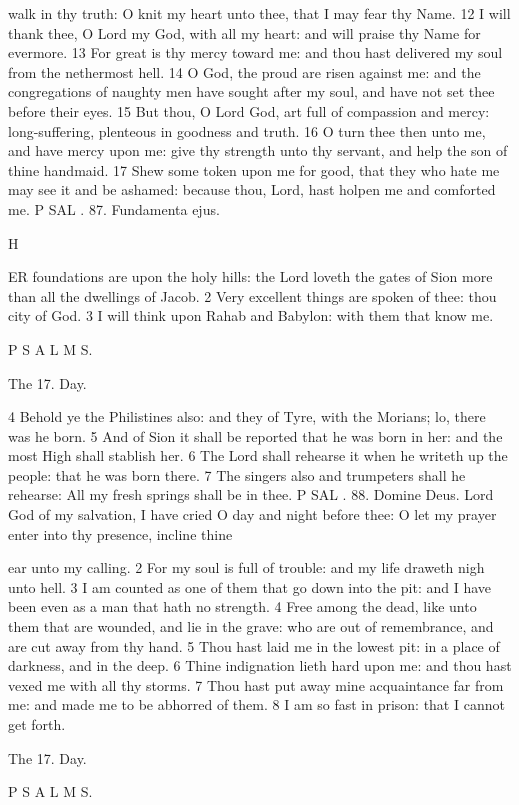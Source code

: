 walk in thy truth: O knit my heart unto thee, that I may fear thy Name. 12 I will thank thee, O Lord my God, with all my heart: and will praise thy Name for evermore. 13 For great is thy mercy toward me: and thou hast delivered my soul from the nethermost hell. 14 O God, the proud are risen against me: and the congregations of naughty men have sought after my soul, and have not set thee before their eyes. 15 But thou, O Lord God, art full of compassion and mercy: long-suffering, plenteous in goodness and truth. 16 O turn thee then unto me, and have mercy upon me: give thy strength unto thy servant, and help the son of thine handmaid. 17 Shew some token upon me for good, that they who hate me may see it and be ashamed: because thou, Lord, hast holpen me and comforted me. P SAL . 87. Fundamenta ejus.

H

ER foundations are upon the holy hills: the Lord loveth the gates of Sion more than all the dwellings of Jacob. 2 Very excellent things are spoken of thee: thou city of God. 3 I will think upon Rahab and Babylon: with them that know me.

P S A L M S.

The 17. Day.

4 Behold ye the Philistines also: and they of Tyre, with the Morians; lo, there was he born. 5 And of Sion it shall be reported that he was born in her: and the most High shall stablish her. 6 The Lord shall rehearse it when he writeth up the people: that he was born there. 7 The singers also and trumpeters shall he rehearse: All my fresh springs shall be in thee. P SAL . 88. Domine Deus. Lord God of my salvation, I have cried O day and night before thee: O let my prayer enter into thy presence, incline thine

ear unto my calling. 2 For my soul is full of trouble: and my life draweth nigh unto hell. 3 I am counted as one of them that go down into the pit: and I have been even as a man that hath no strength. 4 Free among the dead, like unto them that are wounded, and lie in the grave: who are out of remembrance, and are cut away from thy hand. 5 Thou hast laid me in the lowest pit: in a place of darkness, and in the deep. 6 Thine indignation lieth hard upon me: and thou hast vexed me with all thy storms. 7 Thou hast put away mine acquaintance far from me: and made me to be abhorred of them. 8 I am so fast in prison: that I cannot get forth.

The 17. Day.

P S A L M S.


